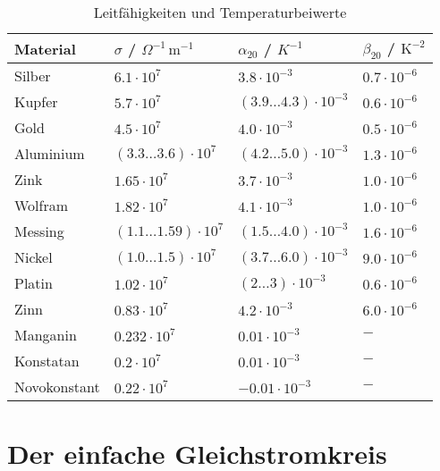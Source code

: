 \begin{table}[H]
\centering
\begin{tabular}{llll}
\hline
Material&$\sigma$ / $\Omega^{-1}\,\text{m}^{-1}$&$\alpha_{20}$ / $K^{-1}$&$\beta_{20}$ / $\text{K}^{-2}$\\\hline
Silber&$6.1\cdot 10^7$&$3.8\cdot 10^{-3}$&$0.7\cdot 10^{-6}$\\
Kupfer&$5.7\cdot 10^7$&$\left(3.9\dotso 4.3\right)\cdot 10^{-3}$&$0.6\cdot 10^{-6}$\\
Gold&$4.5\cdot 10^7$&$4.0\cdot 10^{-3}$&$0.5\cdot 10^{-6}$\\
Aluminium&$\left(3.3\dotso 3.6\right)\cdot 10^7$&$\left(4.2\dotso 5.0\right)\cdot 10^{-3}$&$1.3\cdot 10^{-6}$\\
Zink&$1.65\cdot 10^7$&$3.7\cdot 10^{-3}$&$1.0\cdot 10^{-6}$\\
Wolfram&$1.82\cdot 10^7$&$4.1\cdot 10^{-3}$&$1.0\cdot 10^{-6}$\\
Messing&$\left(1.1\dotso 1.59\right)\cdot 10^7$&$\left(1.5\dotso 4.0\right)\cdot 10^{-3}$&$1.6\cdot 10^{-6}$\\
Nickel&$\left(1.0\dotso 1.5\right)\cdot 10^7$&$\left(3.7\dotso 6.0\right)\cdot 10^{-3}$&$9.0\cdot 10^{-6}$\\
Platin&$1.02\cdot 10^7$&$\left(2\dotso 3\right)\cdot 10^{-3}$&$0.6\cdot 10^{-6}$\\
Zinn&$0.83\cdot 10^7$&$4.2\cdot 10^{-3}$&$6.0\cdot 10^{-6}$\\
Manganin&$0.232\cdot 10^7$&$0.01\cdot 10^{-3}$&$-$\\
Konstatan&$0.2\cdot 10^7$&$0.01\cdot 10^{-3}$&$-$\\
Novokonstant&$0.22\cdot 10^7$&$-0.01\cdot 10^{-3}$&$-$\\\hline
\end{tabular}
\caption{Leitfähigkeiten und Temperaturbeiwerte}
\end{table}
\section{Der einfache Gleichstromkreis}
